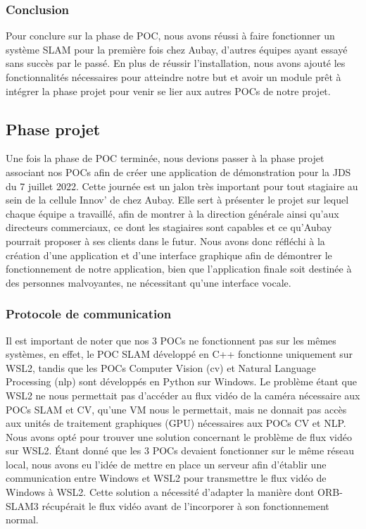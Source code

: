\documentclass[11pt]{article}
\begin{document}
      \subsubsection{Conclusion}
        Pour conclure sur la phase de POC, nous avons réussi à faire fonctionner un système SLAM pour la première fois chez Aubay, d'autres
        équipes ayant essayé sans succès par le passé. En plus de réussir l'installation, nous avons ajouté les fonctionnalités nécessaires
        pour atteindre notre but et avoir un module prêt à intégrer la phase projet pour venir se lier aux autres POCs de notre projet.

    \subsection{Phase projet}
      Une fois la phase de POC terminée, nous devions passer à la phase projet associant nos POCs
      afin de créer une application de démonstration pour la JDS du 7 juillet 2022. Cette journée est un jalon très important
      pour tout stagiaire au sein de la cellule Innov' de chez Aubay. Elle sert à présenter le projet sur lequel chaque équipe a travaillé,
      afin de montrer à la direction générale ainsi qu'aux directeurs commerciaux, ce dont les stagiaires sont capables et ce qu'Aubay pourrait
      proposer à ses clients dans le futur. Nous avons donc réfléchi à la création d'une application et d'une
      interface graphique afin de démontrer le fonctionnement de notre application, bien que l'application finale soit destinée 
      à des personnes malvoyantes, ne nécessitant qu'une interface vocale.

      \subsubsection{Protocole de communication}
        Il est important de noter que nos 3 POCs ne fonctionnent pas sur les mêmes systèmes, en effet, le POC SLAM développé en C++
        fonctionne uniquement sur WSL2, tandis que les POCs Computer Vision (\acrshort{cv}) et Natural Language Processing (\acrshort{nlp}) 
        sont développés en Python sur Windows. Le problème étant que WSL2 ne nous permettait pas d'accéder au flux vidéo de la caméra nécessaire 
        aux POCs SLAM et CV, qu'une VM nous le permettait, mais ne donnait pas accès aux unités de traitement graphiques (GPU) nécessaires aux 
        POCs CV et NLP. Nous avons opté pour 
        trouver une solution concernant le problème de flux vidéo sur WSL2. Étant donné que les 3 POCs devaient fonctionner sur le même réseau 
        local, nous avons eu l'idée de mettre en place un serveur afin d'établir une communication entre Windows et WSL2 pour transmettre le flux 
        vidéo de Windows à WSL2. Cette solution a nécessité d'adapter la manière dont ORB-SLAM3 récupérait le flux vidéo avant de l'incorporer à 
        son fonctionnement normal.
\end{document}
